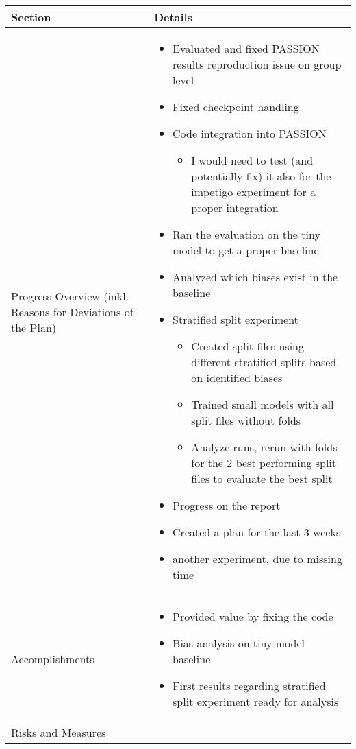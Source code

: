 \documentclass[a4paper,11pt]{article}
\newcommand{\done}{\textcolor{green}{\ding{52}}}
\newcommand{\ongoing}{\textcolor{orange}{\ding{45}}}
\newcommand{\notstarted}{\textcolor{red}{\ding{56}}}
\begin{document}
	
	\renewcommand{\arraystretch}{1.5}
	\begin{longtable}{|p{3.5cm}|>{\vspace{-\baselineskip}}p{12cm}|}
		\hline
		\textbf{Section} & \textbf{Details} \\
		\hline
		Progress Overview (inkl. Reasons for Deviations of the Plan) & \begin{itemize}[topsep=6pt]
			\item[\done] Evaluated and fixed PASSION results reproduction issue on group level
			\item[\done] Fixed checkpoint handling
			\item[\ongoing] Code integration into PASSION
			\begin{itemize}
				\item I would need to test (and potentially fix) it also for the impetigo experiment for a proper integration
			\end{itemize}
			\item[\done] Ran the evaluation on the tiny model to get a proper baseline
			\item[\done] Analyzed which biases exist in the baseline
			\item[\ongoing] Stratified split experiment
			 \begin{itemize}
			 	\item[\done] Created split files using different stratified splits based on identified biases
			 	\item[\done] Trained small models with all split files without folds
			 	\item[\notstarted] Analyze runs, rerun with folds for the 2 best performing split files to evaluate the best split
			 \end{itemize}
			\item[\done] Progress on the report
			\item[\done] Created a plan for the last 3 weeks
			\item[\notstarted] another experiment, due to missing time
		\end{itemize} \\
		\hline
		Accomplishments & \begin{itemize}[topsep=6pt]
		\item[\done] Provided value by fixing the code
		\item[\done] Bias analysis on tiny model baseline
		\item[\done] First results regarding stratified split experiment ready for analysis
		\end{itemize} \\
		\hline
		Risks and Measures &
		

\end{longtable}
\end{document}
